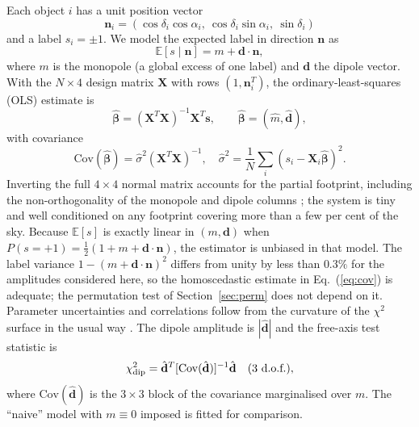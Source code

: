 \documentclass[preprint,12pt]{elsarticle}
\begin{document}
Each object $i$ has a unit position vector
\begin{equation}
    \mathbf{n}_i = \left(\cos\delta_i\cos\alpha_i,\ \cos\delta_i\sin\alpha_i,\ \sin\delta_i\right)
\end{equation}
and a label $s_i=\pm1$.
We model the expected label in direction $\mathbf{n}$ as
\begin{equation}
    \mathbb{E}[s \mid \mathbf{n}] = m + \mathbf{d}\cdot\mathbf{n},
    \label{eq:model}
\end{equation}
where $m$ is the monopole (a global excess of one label) and $\mathbf d$ the dipole vector.
With the $N \times 4$ design matrix $\mathbf{X}$ with rows $(1, \mathbf{n}_i^T)$, the ordinary-least-squares (OLS) estimate is
\begin{equation}
    \hat{\boldsymbol{\beta}} = (\mathbf{X}^T\mathbf{X})^{-1}\mathbf{X}^T\mathbf{s},
    \qquad \hat{\boldsymbol\beta} = (\hat m, \hat{\mathbf{d}}),
    \label{eq:ols}
\end{equation}
with covariance
\begin{equation}
    \mathrm{Cov}(\hat{\boldsymbol\beta}) = \hat\sigma^2(\mathbf{X}^T\mathbf{X})^{-1},\quad
    \hat\sigma^2 = \frac{1}{N}\sum_i (s_i - \mathbf{X}_i\hat{\boldsymbol\beta})^2 .
    \label{eq:cov}
\end{equation}
Inverting the full $4\times4$ normal matrix accounts for the partial footprint, including the non-orthogonality of the monopole and dipole columns \cite{Arioli2012}; the system is tiny and well conditioned on any footprint covering more than a few per cent of the sky.
Because $\mathbb{E}[s]$ is exactly linear in $(m, \mathbf{d})$ when $P(s{=}{+}1) = \tfrac12(1 + m + \mathbf{d}\cdot\mathbf{n})$, the estimator is unbiased in that model.
The label variance $1-(m+\mathbf d\cdot\mathbf n)^2$ differs from unity by less than $0.3\%$ for the amplitudes considered here, so the homoscedastic estimate in Eq.~(\ref{eq:cov}) is adequate; the permutation test of Section~\ref{sec:perm} does not depend on it.
Parameter uncertainties and correlations follow from the curvature of the $\chi^2$ surface in the usual way \cite{James1975}.
The dipole amplitude is $|\hat{\mathbf{d}}|$ and the free-axis test statistic is
\begin{equation}
    \chi^2_{\rm dip} = \hat{\mathbf{d}}^T[\mathrm{Cov}(\hat{\mathbf{d}})]^{-1}\hat{\mathbf{d}}\quad (3\ \text{d.o.f.}),
    \label{eq:chi2dip}
\end{equation}
where $\mathrm{Cov}(\hat{\mathbf{d}})$ is the $3\times3$ block of the covariance marginalised over $m$.
The ``naive'' model with $m \equiv 0$ imposed is fitted for comparison.
\end{document}

